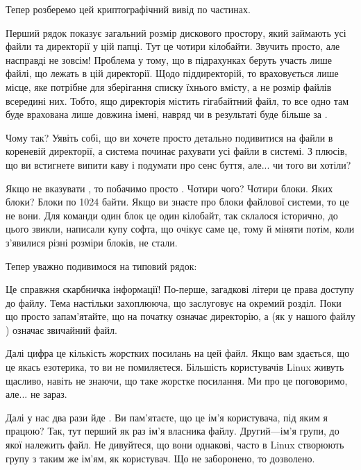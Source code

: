 Тепер розберемо цей криптографічний вивід по частинах.

Перший рядок  показує загальний розмір дискового простору,
який займають усі файли та директорії у цій папці.
Тут це чотири кілобайти.
Звучить просто, але насправді не зовсім!
Проблема у тому, що в підрахунках беруть участь лише файлі, що лежать в цій директорії.
Щодо піддиректорій, то враховується лише місце,
яке потрібне для зберігання списку їхнього вмісту,
а не розмір файлів всередині них.
Тобто, ящо директорія  містить гігабайтний файл,
то все одно там буде врахована лише довжина імені,
навряд чи в результаті буде більше за .

Чому так?
Уявіть собі, що ви хочете просто детально подивитися на файли в кореневій директорії,
а система починає рахувати усі файли в системі.
З плюсів, що ви встигнете випити каву і подумати про сенс буття,
але... чи того ви хотіли?

Якщо не вказувати , то побачимо просто .
Чотири чого?  Чотири блоки. Яких блоки? Блоки по 1024 байти.
Якщо ви знаєте про блоки файлової системи, то це не вони.
Для команди  один блок це один кілобайт, так склалося історично,
до цього звикли, написали купу софта, що очікує саме це,
тому й міняти потім, коли з'явилися різні розміри блоків, не стали.

Тепер уважно подивимося на типовий рядок:
\par{}

Це справжня скарбничка інформації!
По-перше, загадкові літери  це права доступу до файлу.
Тема настільки захоплююча, що заслуговує на окремий розділ.
Поки що просто запам'ятайте, що  на початку означає директорію,
а \term{-} (як у нашого файлу ) означає звичайний файл.

Далі цифра  це кількість жорстких посилань на цей файл.
Якщо вам здається, що це якась езотерика, то ви не помиляєтеся.
Більшість користувачів Linux живуть щасливо, навіть не знаючи, що таке жорстке посилання.
Ми про це поговоримо, але... не зараз.

Далі у нас два рази йде .
Ви пам'ятаєте, що  це ім'я користувача, під яким я працюю?
Так, тут перший як раз ім'я власника файлу.
Другий---ім'я групи, до якої належить файл.
Не дивуйтеся, що вони однакові, часто в Linux створюють групу з таким же ім'ям, як користувач.
Що не заборонено, то дозволено.


